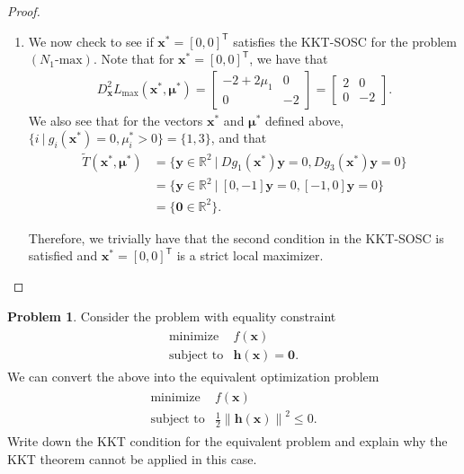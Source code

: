 \documentclass[12pt]{article}
\theoremstyle{definition}
\newtheorem{problem}{Problem}
\newcommand{\vc}[1]{\boldsymbol{#1}}
\newcommand{\norm}[1]{\left\lVert#1\right\rVert}
\newcommand{\tran}{\mathsf{T}}
\begin{document}
\begin{proof}
\begin{enumerate}
      For the problem $(N_1\text{-max})$, conditions
      ii b.\ and iii b.\ imply that $\mu_2 - \mu_3 = -\mu_3 = -4$ and $\mu_2 - \mu_1 = -\mu_1 = -2$
      or that $\mu_1 = 2$, $\mu_2 = 0$, and $\mu_3 = 4$. Therefore, the vector $\vc{x}^* = [0,0]^\tran$
      satisfies the KKT-FONC for the problem $(N_1\text{-max})$ with associated KKT multiplier $\vc{\mu}^* = [2,0,4]^\tran$.
    \item We now check to see if $\vc{x}^* = [0,0]^\tran$ satisfies the KKT-SOSC for the problem $(N_1\text{-max})$.
      Note that for $\vc{x}^*=[0,0]^\tran$, we have that
      \begin{align*}
        D_{\vc{x}}^2L_{\max}(\vc{x}^*, \vc{\mu}^*) = \begin{bmatrix}-2 + 2\mu_1 & 0 \\ 0 & -2 \end{bmatrix} = \begin{bmatrix}2 & 0 \\ 0 & -2 \end{bmatrix}.
      \end{align*}
      We also see that for the vectors $\vc{x}^*$ and $\vc{\mu}^*$ defined above, $\{i\ |\ g_i(\vc{x}^*) = 0, \mu_i^* > 0\} = \{1,3\}$, and that
      \begin{align*}
        \widetilde{T}(\vc{x}^*, \vc{\mu}^*) &= \{\vc{y}\in\mathbb{R}^2 \ |\ Dg_1(\vc{x}^*)\vc{y} = 0, Dg_3(\vc{x}^*)\vc{y} = 0\} \\
        &= \{\vc{y}\in\mathbb{R}^2 \ |\ [0, -1]\vc{y} = 0, [-1, 0]\vc{y} = 0\} \\
        &= \{\vc{0}\in\mathbb{R}^2\}.
      \end{align*}

      Therefore, we trivially have that the second condition in the KKT-SOSC is satisfied
      and $\vc{x}^{*} = [0,0]^\tran$ is a strict local maximizer.
  \end{enumerate}
\end{proof}



\begin{problem}
  Consider the problem with equality constraint
  \begin{align*}
    \begin{array}{rl}
      \text{minimize} & f(\vc{x})\\
      \text{subject to} & \vc{h}(\vc{x}) = \vc{0}.
    \end{array}
  \end{align*}
  We can convert the above into the equivalent optimization problem
  \begin{align*}
    \begin{array}{rl}
      \text{minimize} & f(\vc{x})\\
      \text{subject to} & \frac{1}{2} \norm{\vc{h}(\vc{x})}^2 \leq 0.
    \end{array}
  \end{align*}
  Write down the KKT condition for the equivalent problem and explain why the KKT
  theorem cannot be applied in this case.
\end{problem}
\end{document}
